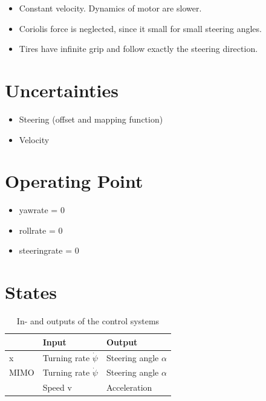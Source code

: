 \documentclass[conference]{IEEEtran}
\begin{document}
\begin{itemize}
    \item Constant velocity. Dynamics of motor are slower.
    \item Coriolis force is neglected, since it small for small steering angles.
    \item Tires have infinite grip and follow exactly the steering direction.
\end{itemize}

 
\section{Uncertainties}

\begin{itemize}
    \item Steering (offset and mapping function)
    \item Velocity
\end{itemize}
 
\section{Operating Point}

\begin{itemize}
    \item yawrate = 0
    \item rollrate = 0
    \item steeringrate = 0
\end{itemize}

\section{States}

\begin{table}[h]
\begin{center}
\begin{tabular}{|l||l|l|}
\hline
 		& Input 		& Output\\
\hline
x 	& Turning rate $\dot{\psi}$ 	& Steering angle $\alpha$\\
\hline
MIMO 	& Turning rate $\dot{\psi}$ 	& Steering angle $\alpha$\\
     	& Speed v 		& Acceleration\\
\hline
\end{tabular}
\caption{In- and outputs of the control systems}  
\label{figure:controlinout}
\end{center}
\end{table}
\end{document}
